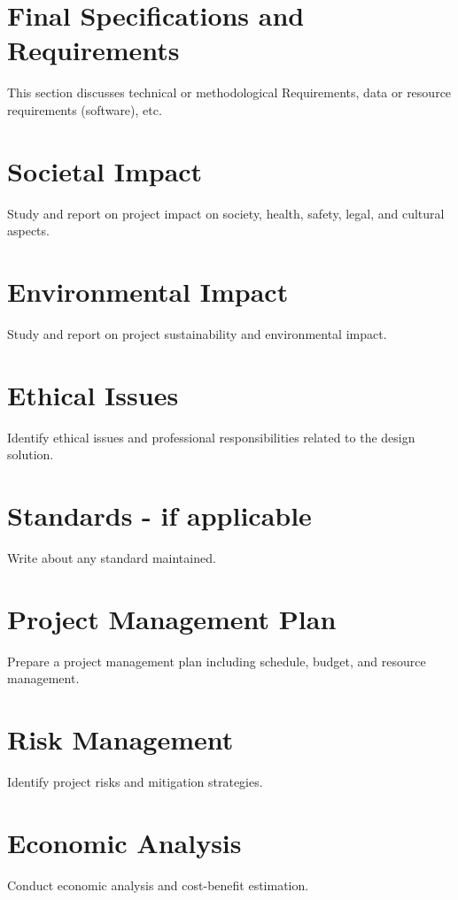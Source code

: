\section{Final Specifications and Requirements}
This section discusses technical or methodological Requirements, data or resource requirements (software), etc.

\section{Societal Impact}
Study and report on project impact on society, health, safety, legal, and cultural aspects.

\section{Environmental Impact}
Study and report on project sustainability and environmental impact.

\section{Ethical Issues}
Identify ethical issues and professional responsibilities related to the design solution.

\section{Standards - if applicable}
Write about any standard maintained.

\section{Project Management Plan}
Prepare a project management plan including schedule, budget, and resource management.

\section{Risk Management}
Identify project risks and mitigation strategies.

\section{Economic Analysis}
Conduct economic analysis and cost-benefit estimation.